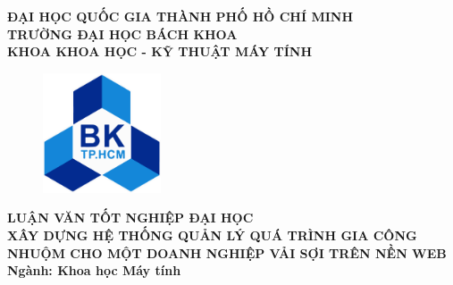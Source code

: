 \documentclass[a4paper,12pt,fleqn,print,oneside]{extarticle}
\begin{document}
\begin{titlepage}


\afterpage{\aftergroup\restoregeometry}
\begin{center}
\textbf{{\Large ĐẠI HỌC QUỐC GIA THÀNH PHỐ HỒ CHÍ MINH \\
TRƯỜNG ĐẠI HỌC BÁCH KHOA \\
KHOA KHOA HỌC - KỸ THUẬT MÁY TÍNH}}
\end{center}

\vspace{0.5cm}

\begin{figure}[h!]
\begin{center}
\includegraphics[width=3.5cm]{Image/hcmut.png}
\end{center}
\end{figure}

\vspace{0.5cm}


\begin{center}
\textbf{{\Large LUẬN VĂN TỐT NGHIỆP ĐẠI HỌC}}\\
\vspace{1cm}
\textbf{{\Large XÂY DỰNG HỆ THỐNG QUẢN LÝ QUÁ TRÌNH GIA CÔNG NHUỘM CHO MỘT DOANH NGHIỆP VẢI SỢI TRÊN NỀN WEB}}\\
\vspace{1cm}
\textbf{{\Large Ngành: Khoa học Máy tính}}
\end{center}

\vspace{2cm}


\end{titlepage}
\end{document}
